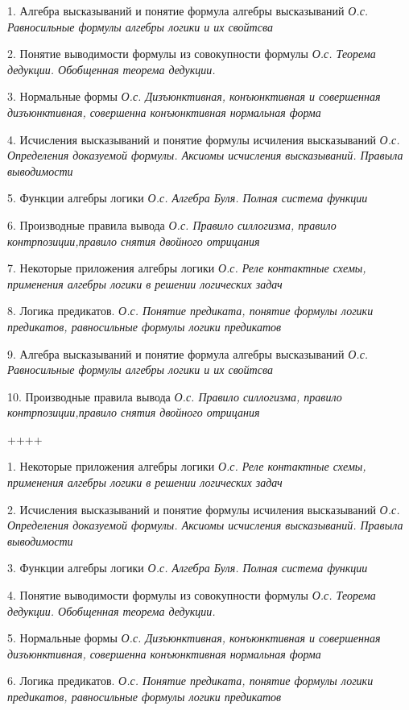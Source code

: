 1. Алгебра высказываний и понятие формула алгебры высказываний \emph{О.с. Равносильные формулы алгебры логики и их свойтсва}

2. Понятие выводимости формулы из совокупности формулы \emph{О.с. Теорема дедукции. Обобщенная теорема дедукции.}

3. Нормальные формы \emph{О.с. Дизъюнктивная, конъюнктивная и совершенная дизъюнктивная, совершенна конъюнктивная нормальная форма}

4. Исчисления высказываний и понятие формулы исчиления высказываний \emph{О.с. Определения доказуемой формулы. Аксиомы исчисления высказываний. Правыла выводимости}

5. Функции алгебры логики \emph{О.с. Алгебра Буля. Полная система функции}

6. Производные правила вывода \emph{О.с. Правило силлогизма, правило контрпозиции,правило снятия двойного отрицания}

7. Некоторые приложения алгебры логики \emph{О.с. Реле контактные схемы, применения алгебры логики в решении логических задач}

8. Логика предикатов. \emph{О.с. Понятие предиката, понятие формулы логики предикатов, равносильные формулы логики предикатов}

9. Алгебра высказываний и понятие формула алгебры высказываний \emph{О.с. Равносильные формулы алгебры логики и их свойтсва}

10. Производные правила вывода \emph{О.с. Правило силлогизма, правило контрпозиции,правило снятия двойного отрицания}

++++

1. Некоторые приложения алгебры логики \emph{О.с. Реле контактные схемы, применения алгебры логики в решении логических задач}

2. Исчисления высказываний и понятие формулы исчиления высказываний \emph{О.с. Определения доказуемой формулы. Аксиомы исчисления высказываний. Правыла выводимости}

3. Функции алгебры логики \emph{О.с. Алгебра Буля. Полная система функции}

4. Понятие выводимости формулы из совокупности формулы \emph{О.с. Теорема дедукции. Обобщенная теорема дедукции.}

5. Нормальные формы \emph{О.с. Дизъюнктивная, конъюнктивная и совершенная дизъюнктивная, совершенна конъюнктивная нормальная форма}

6. Логика предикатов. \emph{О.с. Понятие предиката, понятие формулы логики предикатов, равносильные формулы логики предикатов}

